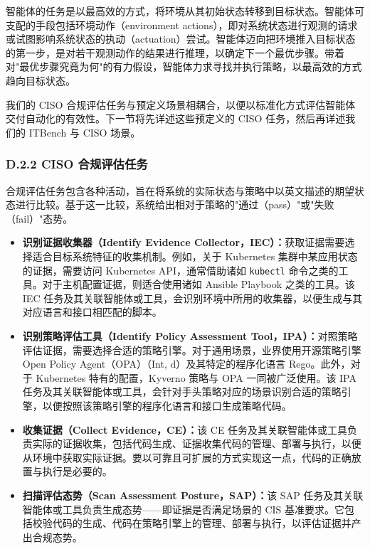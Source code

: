 \documentclass[10pt,UTF8,fontset=fandol]{ctexart}
\begin{document}
智能体的任务是以最高效的方式，将环境从其初始状态转移到目标状态。智能体可支配的手段包括环境动作（environment actions），即对系统状态进行观测的请求或试图影响系统状态的执动（actuation）尝试。智能体迈向把环境推入目标状态的第一步，是对若干观测动作的结果进行推理，以确定下一个最优步骤。带着对"最优步骤究竟为何"的有力假设，智能体力求寻找并执行策略，以最高效的方式趋向目标状态。

我们的 CISO 合规评估任务与预定义场景相耦合，以便以标准化方式评估智能体交付自动化的有效性。下一节将先详述这些预定义的 CISO 任务，然后再详述我们的 ITBench 与 CISO 场景。

\subsubsection{D.2.2 CISO 合规评估任务}

合规评估任务包含各种活动，旨在将系统的实际状态与策略中以英文描述的期望状态进行比较。基于这一比较，系统给出相对于策略的"通过（pass）"或"失败（fail）"态势。

\begin{itemize}
\item \textbf{识别证据收集器（Identify Evidence Collector，IEC）：}获取证据需要选择适合目标系统特征的收集机制。例如，关于 Kubernetes 集群中某应用状态的证据，需要访问 Kubernetes API，通常借助诸如 \texttt{kubectl} 命令之类的工具。对于主机配置证据，则适合使用诸如 Ansible Playbook 之类的工具。该 IEC 任务及其关联智能体或工具，会识别环境中所用的收集器，以便生成与其对应语言和接口相匹配的脚本。
\item \textbf{识别策略评估工具（Identify Policy Assessment Tool，IPA）：}对照策略评估证据，需要选择合适的策略引擎。对于通用场景，业界使用开源策略引擎 Open Policy Agent（OPA）（Int, d）及其特定的程序化语言 Rego。此外，对于 Kubernetes 特有的配置，Kyverno 策略与 OPA 一同被广泛使用。该 IPA 任务及其关联智能体或工具，会针对手头策略对应的场景识别合适的策略引擎，以便按照该策略引擎的程序化语言和接口生成策略代码。
\item \textbf{收集证据（Collect Evidence，CE）：}该 CE 任务及其关联智能体或工具负责实际的证据收集，包括代码生成、证据收集代码的管理、部署与执行，以便从环境中获取实际证据。要以可靠且可扩展的方式实现这一点，代码的正确放置与执行是必要的。
\item \textbf{扫描评估态势（Scan Assessment Posture，SAP）：}该 SAP 任务及其关联智能体或工具负责生成态势——即证据是否满足场景的 CIS 基准要求。它包括校验代码的生成、代码在策略引擎上的管理、部署与执行，以评估证据并产出合规态势。
\end{itemize}
\end{document}

